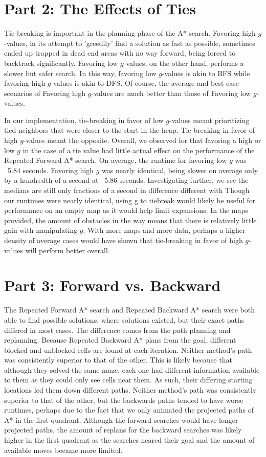 \documentclass[a4paper,12pt]{article}
\begin{document}
\section{Part 2: The Effects of Ties}
Tie-breaking is important in the planning phase of the A* search. Favoring high $g$-values, in its attempt to 'greedily' find a solution as fast as possible, sometimes ended up trapped in dead end areas with no way forward, being forced to backtrack significantly. Favoring low $g$-values, on the other hand, performs a slower but safer search. In this way, favoring low $g$-values is akin to BFS while favoring high $g$-values is akin to DFS. Of course, the average and best case scenarios of Favoring high $g$-values are much better than those of Favoring low $g$-values.

In our implementation, tie-breaking in favor of low $g$-values meant prioritizing tied neighbors that were closer to the start in the heap. Tie-breaking in favor of high $g$-values meant the opposite. Overall, we observed for that favoring a high or low $g$ in the case of a tie value had little actual effect on the performance of the Repeated Forward A* search. On average, the runtime for favoring low $g$ was ~5.84 seconds. Favoring high $g$ was nearly identical, being slower on average only by a hundredth of a second at ~5.86 seconds. Investigating further, we see the medians are still only fractions of a second in difference  different with Though our runtimes were nearly identical, using g to tiebreak would likely be useful for performance on an empty map as it would help limit expansions. In the maps provided, the amount of obstacles in the way means that there is relatively little gain with manipulating $g$. With more maps and more data, perhaps a higher density of average cases would have shown that tie-breaking in favor of high $g$-values will perform better overall.
 	
\section{Part 3: Forward vs. Backward}
The Repeated Forward A* search and Repeated Backward A* search were both able to find possible solutions, where solutions existed, but their exact paths differed in most cases. The difference comes from the path planning and replanning. Because Repeated Backward A* plans from the goal, different blocked and unblocked cells are found at each iteration. Neither method’s path was consistently superior to that of the other. This is likely because that although they solved the same maze, each one had different information available to them as they could only see cells near them. As such, their differing starting locations led them down different paths. Neither method’s path was consistently superior to that of the other, but the backwards paths tended to have worse runtimes, perhaps due to the fact that we only animated the projected paths of A* in the first quadrant. Although the forward searches would have longer projected paths, the amount of replans for the backward searches was likely higher in the first quadrant as the searches neared their goal and the amount of available moves became more limited.
\end{document}
